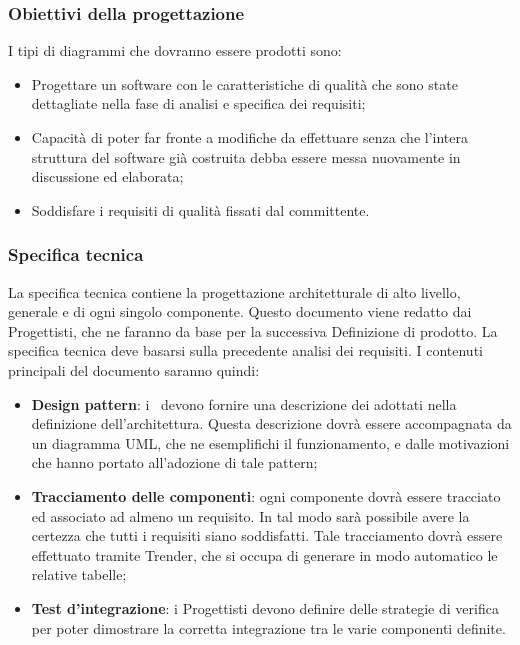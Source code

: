 \documentclass[../NormeDiProgetto.tex]{subfiles}
\begin{document}
            \subsubsection{Obiettivi della progettazione}
                  I tipi di diagrammi che dovranno essere prodotti sono:
                  \begin{itemize}
                        \item Progettare un software con le caratteristiche di qualità che sono state dettagliate nella fase di analisi e specifica dei requisiti;
                        \item Capacità di poter far fronte a modifiche da effettuare senza che l'intera struttura del software già costruita debba essere messa nuovamente in discussione ed elaborata;
                        \item Soddisfare i requisiti di qualità fissati dal committente.
                  \end{itemize}

            \subsubsection{Specifica tecnica}
                  La specifica tecnica contiene la progettazione architetturale di alto livello, generale e di ogni singolo componente.
                  Questo documento viene redatto dai Progettisti, che ne faranno da base per la successiva Definizione di prodotto.
                  La specifica tecnica deve basarsi sulla precedente analisi dei requisiti.
                  I contenuti principali del documento saranno quindi:
                  \begin{itemize}
                        \item \textbf{Design pattern}: i \progettisti\ devono fornire una descrizione dei  adottati
                        nella definizione dell’architettura. Questa descrizione dovrà essere accompagnata da un
                        diagramma UML, che ne esemplifichi il funzionamento, e dalle motivazioni che hanno
                        portato all’adozione di tale pattern;
                        \item \textbf{Tracciamento delle componenti}: ogni componente dovrà essere tracciato ed associato
                        ad almeno un requisito. In tal modo sarà possibile avere la certezza che tutti i requisiti
                        siano soddisfatti. Tale tracciamento dovrà essere effettuato tramite Trender, che si occupa
                        di generare in modo automatico le relative tabelle;
                        \item \textbf{Test d’integrazione}: i Progettisti devono definire delle strategie di verifica per poter
                        dimostrare la corretta integrazione tra le varie componenti definite.
                  \end{itemize}
\end{document}
